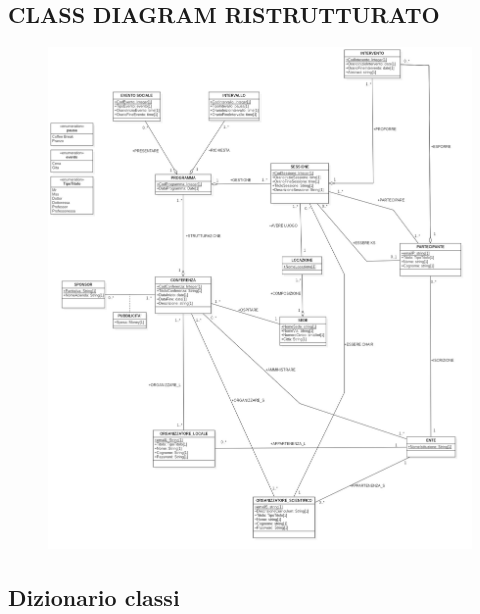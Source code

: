 \documentclass[a4page]{article}
\begin{document}
\subsection{CLASS DIAGRAM RISTRUTTURATO}
\vspace{2cm}
\begin{figure}[h!]
\centering
\includegraphics[width=16.5cm]{CSR}
\end{figure}
\newpage
\subsection{Dizionario classi}
\end{document}
